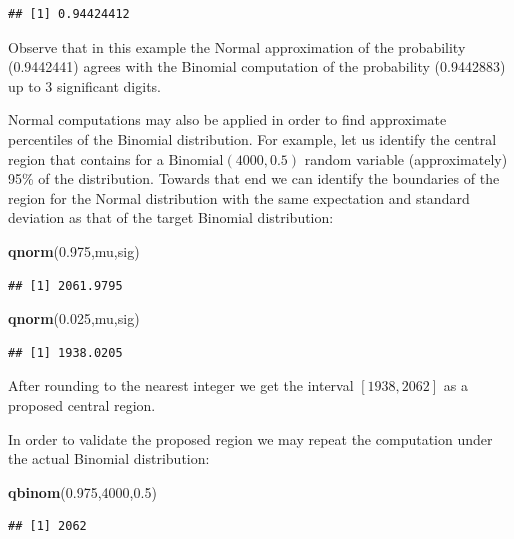 \documentclass[]{krantz}
\makeatletter
\newenvironment{Shaded}{\begin{snugshade}}{\end{snugshade}}
\newcommand{\KeywordTok}[1]{\textcolor[rgb]{0.13,0.29,0.53}{\textbf{#1}}}
\newcommand{\DecValTok}[1]{\textcolor[rgb]{0.00,0.00,0.81}{#1}}
\newcommand{\FloatTok}[1]{\textcolor[rgb]{0.00,0.00,0.81}{#1}}
\newcommand{\NormalTok}[1]{#1}
\newenvironment{kframe}{%
\medskip{}
\setlength{\fboxsep}{.8em}
 \def\at@end@of@kframe{}%
 \ifinner\ifhmode%
  \def\at@end@of@kframe{\end{minipage}}%
  \begin{minipage}{\columnwidth}%
 \fi\fi%
 \def\FrameCommand##1{\hskip\@totalleftmargin \hskip-\fboxsep
 \colorbox{shadecolor}{##1}\hskip-\fboxsep
     \hskip-\linewidth \hskip-\@totalleftmargin \hskip\columnwidth}%
 \MakeFramed {\advance\hsize-\width
   \@totalleftmargin\z@ \linewidth\hsize
   \@setminipage}}%
 {\par\unskip\endMakeFramed%
 \at@end@of@kframe}
\renewenvironment{Shaded}{\begin{kframe}}{\end{kframe}}
\theoremstyle{definition}
\theoremstyle{definition}
\theoremstyle{definition}
\theoremstyle{remark}
\makeatother
\begin{document}
\begin{verbatim}
## [1] 0.94424412
\end{verbatim}

Observe that in this example the Normal approximation of the probability
(0.9442441) agrees with the Binomial computation of the probability
(0.9442883) up to 3 significant digits.

Normal computations may also be applied in order to find approximate
percentiles of the Binomial distribution. For example, let us identify
the central region that contains for a \(\mathrm{Binomial}(4000,0.5)\)
random variable (approximately) 95\% of the distribution. Towards that
end we can identify the boundaries of the region for the Normal
distribution with the same expectation and standard deviation as that of
the target Binomial distribution:

\begin{Shaded}
\begin{Highlighting}[]
\KeywordTok{qnorm}\NormalTok{(}\FloatTok{0.975}\NormalTok{,mu,sig)}
\end{Highlighting}
\end{Shaded}

\begin{verbatim}
## [1] 2061.9795
\end{verbatim}

\begin{Shaded}
\begin{Highlighting}[]
\KeywordTok{qnorm}\NormalTok{(}\FloatTok{0.025}\NormalTok{,mu,sig)}
\end{Highlighting}
\end{Shaded}

\begin{verbatim}
## [1] 1938.0205
\end{verbatim}

After rounding to the nearest integer we get the interval
\([1938,2062]\) as a proposed central region.

In order to validate the proposed region we may repeat the computation
under the actual Binomial distribution:

\begin{Shaded}
\begin{Highlighting}[]
\KeywordTok{qbinom}\NormalTok{(}\FloatTok{0.975}\NormalTok{,}\DecValTok{4000}\NormalTok{,}\FloatTok{0.5}\NormalTok{)}
\end{Highlighting}
\end{Shaded}

\begin{verbatim}
## [1] 2062
\end{verbatim}
\end{document}
